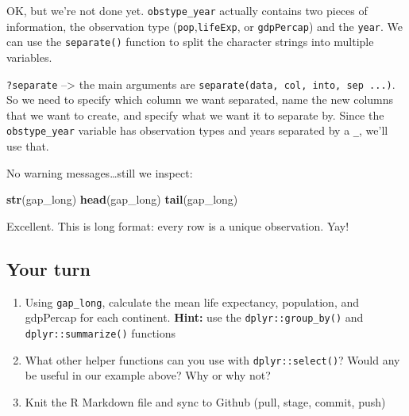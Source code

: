 \documentclass[]{book}
\newenvironment{Shaded}{\begin{snugshade}}{\end{snugshade}}
\newcommand{\KeywordTok}[1]{\textcolor[rgb]{0.13,0.29,0.53}{\textbf{#1}}}
\newcommand{\DataTypeTok}[1]{\textcolor[rgb]{0.13,0.29,0.53}{#1}}
\newcommand{\StringTok}[1]{\textcolor[rgb]{0.31,0.60,0.02}{#1}}
\newcommand{\OperatorTok}[1]{\textcolor[rgb]{0.81,0.36,0.00}{\textbf{#1}}}
\newcommand{\NormalTok}[1]{#1}
\theoremstyle{definition}
\theoremstyle{definition}
\theoremstyle{definition}
\theoremstyle{remark}
\begin{document}
OK, but we're not done yet. \texttt{obstype\_year} actually contains two
pieces of information, the observation type
(\texttt{pop},\texttt{lifeExp}, or \texttt{gdpPercap}) and the
\texttt{year}. We can use the \texttt{separate()} function to split the
character strings into multiple variables.

\texttt{?separate} --\textgreater{} the main arguments are
\texttt{separate(data,\ col,\ into,\ sep\ ...)}. So we need to specify
which column we want separated, name the new columns that we want to
create, and specify what we want it to separate by. Since the
\texttt{obstype\_year} variable has observation types and years
separated by a \texttt{\_}, we'll use that.

\begin{Shaded}
\end{Shaded}

No warning messages\ldots{}still we inspect:

\begin{Shaded}
\begin{Highlighting}[]
\KeywordTok{str}\NormalTok{(gap_long)}
\KeywordTok{head}\NormalTok{(gap_long)}
\KeywordTok{tail}\NormalTok{(gap_long)}
\end{Highlighting}
\end{Shaded}

Excellent. This is long format: every row is a unique observation. Yay!

\subsection{Your turn}\label{your-turn-11}

\begin{enumerate}
\def\labelenumi{\arabic{enumi}.}
\item
  Using \texttt{gap\_long}, calculate the mean life expectancy,
  population, and gdpPercap for each continent. \textbf{Hint:} use the
  \texttt{dplyr::group\_by()} and \texttt{dplyr::summarize()} functions
\item
  What other helper functions can you use with \texttt{dplyr::select()}?
  Would any be useful in our example above? Why or why not?
\item
  Knit the R Markdown file and sync to Github (pull, stage, commit,
  push)
\end{enumerate}
\end{document}

